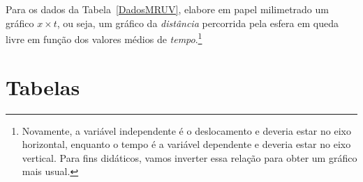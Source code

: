 \begin{question}[type={exam}]
Para os dados da Tabela~\ref{DadosMRUV}, elabore em papel milimetrado um gráfico $x \times t$, ou seja, um gráfico da \emph{distância} percorrida pela esfera em queda livre em função dos valores médios de \emph{tempo}.\footnote{Novamente, a variável independente é o deslocamento e deveria estar no eixo horizontal, enquanto o tempo é a variável dependente e deveria estar no eixo vertical. Para fins didáticos, vamos inverter essa relação para obter um gráfico mais usual.}
\end{question}
\vfill
\pagebreak
\section{Tabelas}

